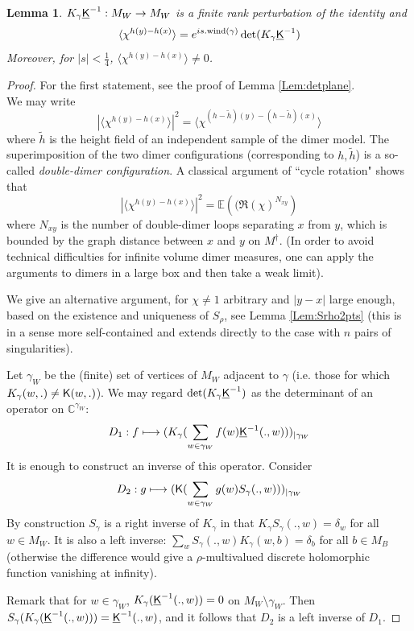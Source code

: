 \documentclass[10pt]{article}
\newcommand{\C}{\mathbb{C}}
\newcommand{\E}{\mathbb{E}}
\newcommand{\rK}{{\sf K}}
\newcommand{\uK}{{\underline {\sf K}}}
\newcommand{\dg}{\dagger}
\newtheorem{Lem}[thm]{Lemma}
\begin{document}
\begin{Lem}\label{Lem:fredelectr}
$K_\gamma\uK^{-1}:M_W\rightarrow M_W$ is a finite rank perturbation of the identity and
$$\langle \chi^{h(y)-h(x)}\rangle=e^{is.{\rm wind}(\gamma)}\det(K_\gamma\uK^{-1})$$
Moreover, for $|s|<\frac 14$, $\langle  \chi^{h(y)-h(x)}\rangle\neq 0$.
\end{Lem}
\begin{proof}
For the first statement, see the proof of Lemma \ref{Lem:detplane}.\\
We may write
$$|\langle \chi^{h(y)-h(x)}\rangle|^2=\langle\chi^{(h-\tilde h)(y)-(h-\tilde h)(x)}\rangle$$
where $\tilde h$ is the height field of an independent sample of the dimer model. The superimposition of the two dimer configurations (corresponding to $h,\tilde h$) is a so-called {\em double-dimer configuration}. A classical argument of ``cycle rotation" shows that
$$ |\langle \chi^{h(y)-h(x)}\rangle|^2=\E\left((\Re(\chi)^{N_{xy}}\right)$$
where $N_{xy}$ is the number of double-dimer loops separating $x$ from $y$, which is bounded by the graph distance between $x$ and $y$ on $M^\dg$. (In order to avoid technical difficulties for infinite volume dimer measures, one can apply the arguments to dimers in a large box and then take a weak limit).

We give an alternative argument, for $\chi\neq 1$ arbitrary and $|y-x|$ large enough, based on the existence and uniqueness of $S_\rho$, see Lemma \ref{Lem:Srho2pts} (this is in a sense more self-contained and extends directly to the case with $n$ pairs of singularities).

Let $\gamma_W$ be the (finite) set of vertices of $M_W$ adjacent to $\gamma$ (i.e. those for which $K_\gamma(w,.)\neq\rK(w,.)$). We may regard $\det(K_\gamma\uK^{-1})$ as the determinant of an operator on $\C^{\gamma_W}$:
$$D_1:f\longmapsto (K_\gamma(\sum_{w\in \gamma_W}f(w)\uK^{-1}(.,w)))_{|\gamma_W}$$
It is enough to construct an inverse of this operator. Consider
$$D_2:g\longmapsto (\rK(\sum_{w\in \gamma_W}g(w)S_\gamma(.,w)))_{|\gamma_W}$$
By construction $S_\gamma$ is a right inverse of $K_\gamma$ in that $K_\gamma S_\gamma(.,w)=\delta_w$ for all $w\in M_W$. It is also a left inverse: $\sum_wS_\gamma(.,w)K_\gamma(w,b)=\delta_b$ for all $b\in M_B$ (otherwise the difference would give a $\rho$-multivalued discrete holomorphic function vanishing at infinity).

Remark that for $w\in\gamma_W$, $K_\gamma(\uK^{-1}(.,w))=0$ on $M_W\setminus\gamma_W$. Then $S_\gamma(K_\gamma(\uK^{-1}(.,w)))=\uK^{-1}(.,w)$, and it follows that $D_2$ is a left inverse of $D_1$.
\end{proof}
\end{document}
